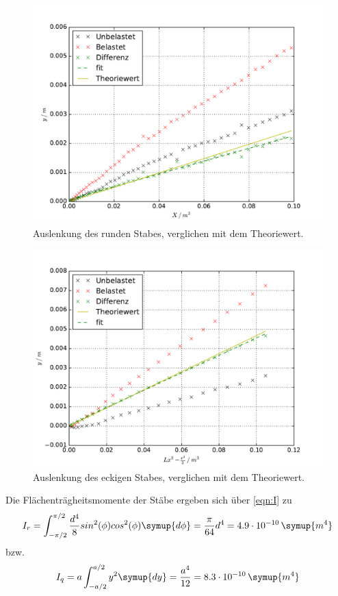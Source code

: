 \begin{figure}
  \centering
  \includegraphics[width = \textwidth]{./Plots/Reihe1.pdf}
  \caption{Auslenkung des runden Stabes, verglichen mit dem Theoriewert.}
  \label{fig:Reihe1}
\end{figure}

\begin{figure}
  \centering
  \includegraphics[width = \textwidth]{./Plots/Reihe2.pdf}
  \caption{Auslenkung des eckigen Stabes, verglichen mit dem Theoriewert.}
  \label{fig:Reihe2}
\end{figure}

Die Flächenträgheitsmomente der Stäbe ergeben sich über \eqref{eqn:I} zu
\begin{equation}
  I_r = \int_{-\pi/2}^{\pi/2} \frac{d^4}{8} sin^2(\phi) cos^2(\phi)\symup{d\phi}= \frac{\pi}{64}d^4 = 4.9 \cdot 10^{-10} \, \symup{m^4}
\end{equation}
bzw.
\begin{equation}
  I_q = a \int_{-a/2}^{a/2} y^2 \symup{dy} =\frac{a^4}{12} = 8.3\cdot 10^{-10} \, \symup{m^4}
\end{equation}


